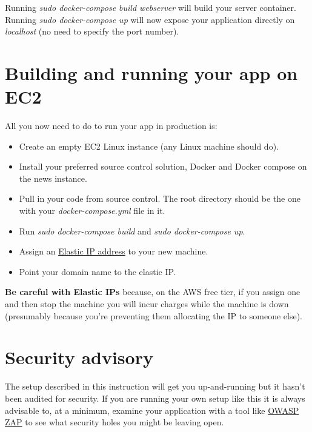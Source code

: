 \documentclass[letterpaper,10pt,english]{sphinxmanual}
\begin{document}
Running \emph{sudo docker-compose build webserver} will build your server container. Running \emph{sudo docker-compose up} will now expose your application directly on \emph{localhost} (no need to specify the port number).


\section{Building and running your app on EC2}
\label{docker_ec2:building-and-running-your-app-on-ec2}
All you now need to do to run your app in production is:
\begin{itemize}
\item {} 
Create an empty EC2 Linux instance (any Linux machine should do).

\item {} 
Install your preferred source control solution, Docker and Docker compose on the news instance.

\item {} 
Pull in your code from source control. The root directory should be the one with your \emph{docker-compose.yml} file in it.

\item {} 
Run \emph{sudo docker-compose build} and \emph{sudo docker-compose up}.

\item {} 
Assign an \href{https://aws.amazon.com/articles/1346}{Elastic IP address} to your new machine.

\end{itemize}
\begin{itemize}
\item {} 
Point your domain name to the elastic IP.

\end{itemize}

\textbf{Be careful with Elastic IPs} because, on the AWS free tier, if you assign one and then stop the machine you will incur charges while the machine is down (presumably because you're preventing them allocating the IP to someone else).


\section{Security advisory}
\label{docker_ec2:security-advisory}
The setup described in this instruction will get you up-and-running but it hasn't been audited for security. If you are running your own setup like this it is always advisable to, at a minimum, examine your application with a tool like \href{https://www.owasp.org/index.php/OWASP\_Zed\_Attack\_Proxy\_Project}{OWASP ZAP} to see what security holes you might be leaving open.
\end{document}
